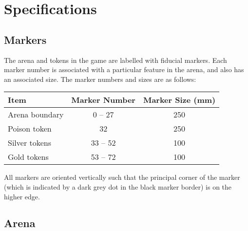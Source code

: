 \section{Specifications}
\label{sec:specs}

\subsection{Markers}
\label{spec:markers}

The arena and tokens in the game are labelled with fiducial
markers. Each marker number is associated with a particular feature in the
arena, and also has an associated size. The marker numbers and sizes are as
follows:

\begin{center}
\begin{tabular}{lcc}
  \toprule
  \textbf{Item} & \textbf{Marker Number} & \textbf{Marker Size (\si{mm})} \\
  \midrule
  Arena boundary & 0 -- 27 & 250 \\
  Poison token & 32 & 250 \\
  Silver tokens & 33 -- 52 & 100 \\
  Gold tokens & 53 -- 72 & 100 \\
  \bottomrule
\end{tabular}
\end{center}

All markers are oriented vertically such that the principal corner of the marker
(which is indicated by a dark grey dot in the black marker border) is on the
higher edge.

\subsection{Arena}
\label{spec:arena}


